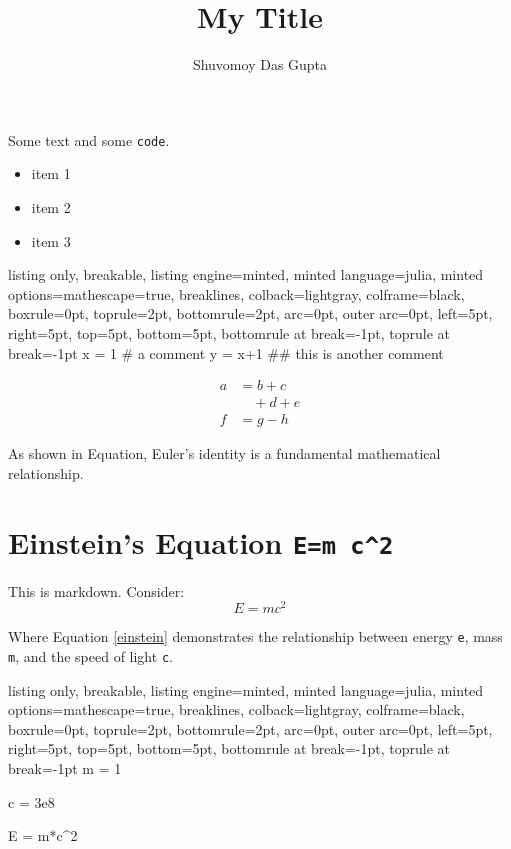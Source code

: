 \documentclass{article}
\title{My Title}
\author{Shuvomoy Das Gupta}
\begin{document}
\maketitle
   
    
Some text and some \texttt{code}.

\begin{itemize}
\item item 1
\item item 2
\item item 3
\end{itemize}

\begin{tcblisting}{listing only, breakable, listing engine=minted, minted language=julia, minted options={mathescape=true, breaklines}, colback=lightgray, colframe=black, boxrule=0pt, toprule=2pt, bottomrule=2pt, arc=0pt, outer arc=0pt, left=5pt, right=5pt, top=5pt, bottom=5pt, bottomrule at break=-1pt, toprule at break=-1pt}
x = 1
# a comment
y = x+1
## this is another comment
\end{tcblisting}


\[
\begin{aligned}
  a &= b + c \\
  & \quad + d + e \\
  f &= g - h
\end{aligned}
\]



As shown in Equation, Euler's identity is a fundamental mathematical relationship.
\section{Einstein's Equation \texttt{E=m c\textasciicircum{}2}}
This is markdown. Consider: 
\begin{equation}\label{einstein}
E = mc^2
\end{equation}

Where Equation \eqref{einstein} demonstrates the relationship between energy \texttt{e}, mass \texttt{m}, and the speed of light \texttt{c}.

\begin{tcblisting}{listing only, breakable, listing engine=minted, minted language=julia, minted options={mathescape=true, breaklines}, colback=lightgray, colframe=black, boxrule=0pt, toprule=2pt, bottomrule=2pt, arc=0pt, outer arc=0pt, left=5pt, right=5pt, top=5pt, bottom=5pt, bottomrule at break=-1pt, toprule at break=-1pt}
m = 1

c = 3e8

E = m*c^2
\end{tcblisting}
\end{document}
